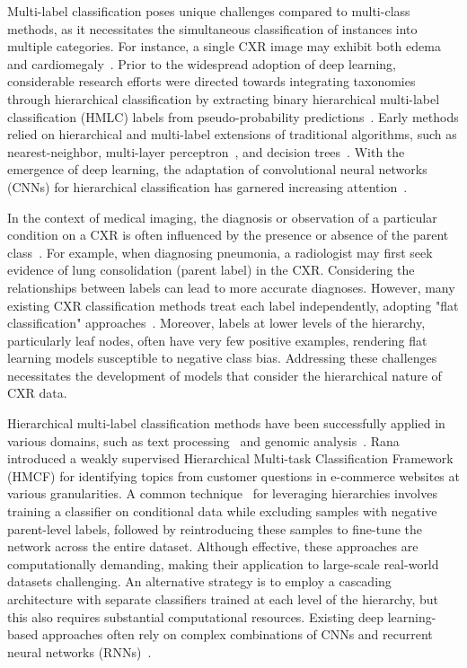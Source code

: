 \documentclass[review,1p,times,numbers]{elsarticle}
\begin{document}
Multi-label classification poses unique challenges compared to multi-class methods, as it necessitates the simultaneous classification of instances into multiple categories. For instance, a single CXR image may exhibit both edema and cardiomegaly~\cite{harvey_Standardised_2019,tsoumakas_MultiLabel_2007}. Prior to the widespread adoption of deep learning, considerable research efforts were directed towards integrating taxonomies through hierarchical classification by extracting binary hierarchical multi-label classification (HMLC) labels from pseudo-probability predictions~\cite{bi_BayesOptimal_2015}. Early methods relied on hierarchical and multi-label extensions of traditional algorithms, such as nearest-neighbor, multi-layer perceptron~\cite{pourghassem_ContentBased_2008}, and decision trees~\cite{dimitrovski_Hierarchical_2011}. With the emergence of deep learning, the adaptation of convolutional neural networks (CNNs) for hierarchical classification has garnered increasing attention~\cite{guo_CNNRNN_2018,kowsari_HDLTex_2017,redmon_YOLO9000_2017,roy_TreeCNN_2020}.

In the context of medical imaging, the diagnosis or observation of a particular condition on a CXR is often influenced by the presence or absence of the parent class~\cite{vaneeden_Relationship_2012}. For example, when diagnosing pneumonia, a radiologist may first seek evidence of lung consolidation (parent label) in the CXR. Considering the relationships between labels can lead to more accurate diagnoses. However, many existing CXR classification methods treat each label independently, adopting "flat classification" approaches~\cite{alaydie_Exploiting_2012}. Moreover, labels at lower levels of the hierarchy, particularly leaf nodes, often have very few positive examples, rendering flat learning models susceptible to negative class bias. Addressing these challenges necessitates the development of models that consider the hierarchical nature of CXR data.

Hierarchical multi-label classification methods have been successfully applied in various domains, such as text processing~\cite{aly_Hierarchical_2019} and genomic analysis~\cite{bi_BayesOptimal_2015}. Rana~\cite{rana_weakly_2023} introduced a weakly supervised Hierarchical Multi-task Classification Framework (HMCF) for identifying topics from customer questions in e-commerce websites at various granularities. A common technique~\cite{chen_Deep_2019} for leveraging hierarchies involves training a classifier on conditional data while excluding samples with negative parent-level labels, followed by reintroducing these samples to fine-tune the network across the entire dataset. Although effective, these approaches are computationally demanding, making their application to large-scale real-world datasets challenging. An alternative strategy is to employ a cascading architecture with separate classifiers trained at each level of the hierarchy, but this also requires substantial computational resources. Existing deep learning-based approaches often rely on complex combinations of CNNs and recurrent neural networks (RNNs)~\cite{guo_CNNRNN_2018,kowsari_HDLTex_2017}.
\end{document}
